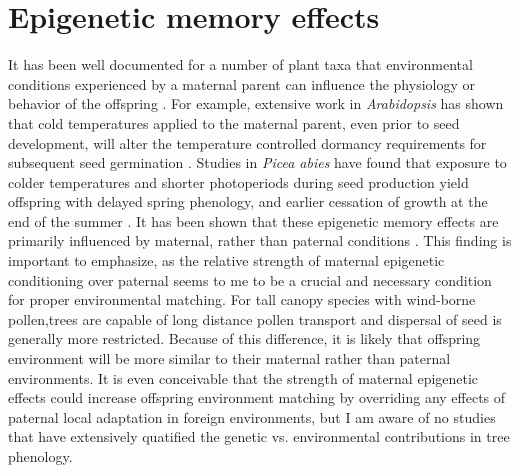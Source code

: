 \documentclass{article}\usepackage[]{graphicx}\usepackage[]{color}
\begin{document}
\section{Epigenetic memory effects}
\par It has been well documented for a number of plant taxa that environmental conditions experienced by a maternal parent can influence the physiology or behavior of the offspring \citep{Brautigam2013}. For example, extensive work in \textit{Arabidopsis} has shown that cold temperatures applied to the maternal parent, even prior to seed development, will alter the temperature controlled dormancy requirements for subsequent seed germination \citep{Auge2017}. Studies in \textit{Picea abies} have found that exposure to colder temperatures and shorter photoperiods during seed production yield offspring with delayed spring phenology, and earlier cessation of growth at the end of the summer \citep{Johnsen2005, Gomory2014}. It has been shown that these epigenetic memory effects are primarily influenced by maternal, rather than paternal conditions \citep{Brautigam2013}. This finding is important to emphasize, as the relative strength of maternal epigenetic conditioning over paternal seems to me to be a crucial and necessary condition for proper environmental matching. For tall canopy species with wind-borne pollen,trees are capable of long distance pollen transport and dispersal of seed is generally more restricted. Because of this difference, it is likely that offspring environment will be more similar to their maternal rather than paternal environments. It is even conceivable that the strength of maternal epigenetic effects could increase offspring environment matching by overriding any effects of paternal local adaptation in foreign environments, but I am aware of no studies that have extensively quatified the  genetic vs. environmental contributions in tree phenology.
\end{document}
